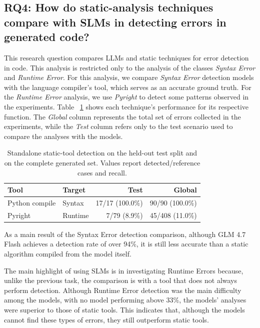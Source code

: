 \subsection{RQ4: How do static-analysis techniques compare with SLMs in detecting errors in generated code?}

This research question compares LLMs and static techniques for error detection in code. This analysis is restricted only to the analysis of the classes \emph{Syntax Error} and \emph{Runtime Error}. For this analysis, we compare \emph{Syntax Error} detection models with the language compiler's tool, which serves as an accurate ground truth. For the \emph{Runtime Error} analysis, we use \emph{Pyright} to detect some patterns observed in the experiments. Table ~\ref{tab:rq4_tools} shows each technique's performance for its respective function. The \emph{Global} column represents the total set of errors collected in the experiments, while the \emph{Test} column refers only to the test scenario used to compare the analyses with the models.


\begin{table}[htbp]
\centering
\caption{Standalone static-tool detection on the held-out test split and on the complete generated set. Values report detected/reference cases and recall.}
\label{tab:rq4_tools}
\begin{tabular}{llrr}
\toprule
\textbf{Tool} & \textbf{Target} & \textbf{Test} & \textbf{Global} \\
\midrule
Python compile & Syntax & 17/17 (100.0\%) & 90/90 (100.0\%) \\
Pyright & Runtime & 7/79 (8.9\%) & 45/408 (11.0\%) \\
\bottomrule
\end{tabular}
\end{table}

As a main result of the Syntax Error detection comparison, although GLM 4.7 Flash achieves a detection rate of over 94\%, it is still less accurate than a static algorithm compiled from the model itself.

The main highlight of using SLMs is in investigating Runtime Errors because, unlike the previous task, the comparison is with a tool that does not always perform detection. Although Runtime Error detection was the main difficulty among the models, with no model performing above 33\%, the models' analyses were superior to those of static tools. This indicates that, although the models cannot find these types of errors, they still outperform static tools.